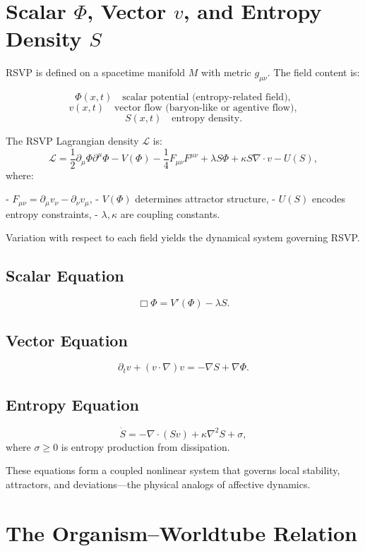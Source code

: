 \documentclass[12pt,oneside]{book}
\theoremstyle{plain}
\theoremstyle{definition}
\def\mathbf#1{#1}%
\begin{document}
\section{Scalar $\Phi$, Vector $\mathbf{v}$, and Entropy Density $S$}

RSVP is defined on a spacetime manifold $M$ with metric $g_{\mu\nu}$.
The field content is:

\[
\Phi(x,t) \quad \text{scalar potential (entropy-related field)},
\]
\[
\mathbf{v}(x,t) \quad \text{vector flow (baryon-like or agentive flow)},
\]
\[
S(x,t) \quad \text{entropy density}.
\]

The RSVP Lagrangian density $\mathcal{L}$ is:
\[
\mathcal{L}
= \frac{1}{2}\partial_\mu \Phi \partial^\mu \Phi
 - V(\Phi)
 - \frac{1}{4} F_{\mu\nu}F^{\mu\nu}
 + \lambda S \Phi
 + \kappa S \nabla\cdot\mathbf{v}
 - U(S),
\]
where:

- $F_{\mu\nu} = \partial_\mu v_\nu - \partial_\nu v_\mu$,
- $V(\Phi)$ determines attractor structure,
- $U(S)$ encodes entropy constraints,
- $\lambda, \kappa$ are coupling constants.

Variation with respect to each field yields the dynamical system
governing RSVP.

\subsection{Scalar Equation}

\[
\Box \Phi = V'(\Phi) - \lambda S.
\]

\subsection{Vector Equation}

\[
\partial_t \mathbf{v} + (\mathbf{v}\cdot\nabla)\mathbf{v}
 = -\nabla S + \nabla\Phi.
\]

\subsection{Entropy Equation}

\[
\dot{S}
 = -\nabla\cdot(S \mathbf{v}) + \kappa \nabla^2 S + \sigma,
\]
where $\sigma \ge 0$ is entropy production from dissipation.

These equations form a coupled nonlinear system that governs local
stability, attractors, and deviations---the physical analogs of
affective dynamics.

\section{The Organism–Worldtube Relation}
\end{document}

